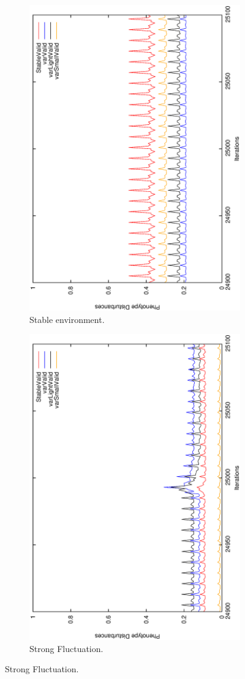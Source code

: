 \begin{figure}[H]
\begin{subfigure}{.25\textwidth}
  \centering
  \includegraphics[width=.7\linewidth, angle =-90]{img/avg499999stableb.eps}
  \caption{Stable environment.}
\end{subfigure}%
\begin{subfigure}{.25\textwidth}
  \centering
  \includegraphics[width=.7\linewidth, angle =-90]{img/avg499999variationb.eps}
  \caption{Strong Fluctuation.}
\end{subfigure}


\end{figure}

